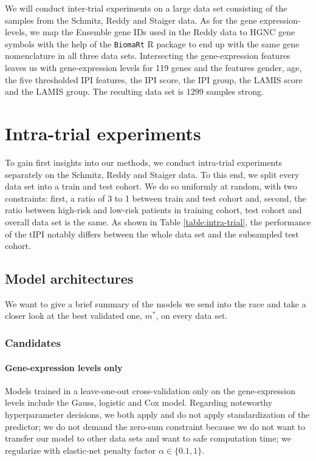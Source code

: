 We will conduct inter-trial experiments on a large data set consisting of the samples from the 
Schmitz, Reddy and Staiger data. As for the gene expression-levels, we map the Ensemble gene IDs 
used in the Reddy data to HGNC gene symbols with the help of the \texttt{BiomaRt} R package 
\cite{biomart09}
to end up with the same gene nomenclature in all three data sets. Intersecting the gene-expression 
features leaves us with gene-expression levels for \num{119} genes and the features gender, age, 
the five thresholded IPI features, the IPI score, the IPI group, the LAMIS score and the LAMIS 
group. The resulting data set is \num{1299} samples strong.

\section{Intra-trial experiments}\label{sec:intra-trial}

To gain first insights into our methods, we conduct intra-trial experiments separately on the 
Schmitz, Reddy and Staiger data. To this end, we split every data set into a train and test 
cohort. We do so uniformly at random, with two constraints: first, a ratio of 3 to 1 between train 
and test cohort and, second, the ratio between high-risk and low-risk patients in training cohort, 
test cohort and overall data set is the same. As shown in Table \ref{table:intra-trial}, the 
performance of the tIPI notably differs between the whole data set and the subsampled test cohort. 



\subsection{Model architectures}

We want to give a brief summary of the models we send into the race and take a closer look at the 
best validated one, $m^*$, on every data set.

\subsubsection{Candidates}

\paragraph{Gene-expression levels only}
Models trained in a leave-one-out cross-validation only on the gene-expression levels include the 
Gauss, logistic and Cox model. Regarding noteworthy hyperparameter decisions, we both apply and 
do not apply standardization of the predictor; we do not demand the zero-sum constraint 
because we do not want to transfer our model to other data sets and want to safe computation time;
we regularize with elastic-net penalty factor $\alpha \in \{ \num{0.1}, 1 \}$.

